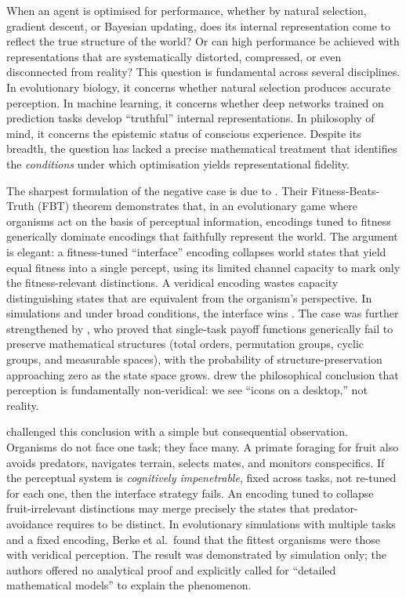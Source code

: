 \documentclass[12pt]{article}
\begin{document}
When an agent is optimised for performance, whether by natural selection, gradient descent, or Bayesian updating, does its internal representation come to reflect the true structure of the world? Or can high performance be achieved with representations that are systematically distorted, compressed, or even disconnected from reality? This question is fundamental across several disciplines. In evolutionary biology, it concerns whether natural selection produces accurate perception. In machine learning, it concerns whether deep networks trained on prediction tasks develop ``truthful'' internal representations. In philosophy of mind, it concerns the epistemic status of conscious experience. Despite its breadth, the question has lacked a precise mathematical treatment that identifies the \emph{conditions} under which optimisation yields representational fidelity.

The sharpest formulation of the negative case is due to \citet{hoffman_etal_2015}. Their Fitness-Beats-Truth (FBT) theorem demonstrates that, in an evolutionary game where organisms act on the basis of perceptual information, encodings tuned to fitness generically dominate encodings that faithfully represent the world. The argument is elegant: a fitness-tuned ``interface'' encoding collapses world states that yield equal fitness into a single percept, using its limited channel capacity to mark only the fitness-relevant distinctions. A veridical encoding wastes capacity distinguishing states that are equivalent from the organism's perspective. In simulations and under broad conditions, the interface wins \citep{prakash_etal_2021}. The case was further strengthened by \citet{prakash_etal_2020}, who proved that single-task payoff functions generically fail to preserve mathematical structures (total orders, permutation groups, cyclic groups, and measurable spaces), with the probability of structure-preservation approaching zero as the state space grows. \citet{hoffman_2019} drew the philosophical conclusion that perception is fundamentally non-veridical: we see ``icons on a desktop,'' not reality.

\citet{berke_etal_2022} challenged this conclusion with a simple but consequential observation. Organisms do not face one task; they face many. A primate foraging for fruit also avoids predators, navigates terrain, selects mates, and monitors conspecifics. If the perceptual system is \emph{cognitively impenetrable}, fixed across tasks, not re-tuned for each one, then the interface strategy fails. An encoding tuned to collapse fruit-irrelevant distinctions may merge precisely the states that predator-avoidance requires to be distinct. In evolutionary simulations with multiple tasks and a fixed encoding, Berke et al.\ found that the fittest organisms were those with veridical perception. The result was demonstrated by simulation only; the authors offered no analytical proof and explicitly called for ``detailed mathematical models'' to explain the phenomenon.
\end{document}
